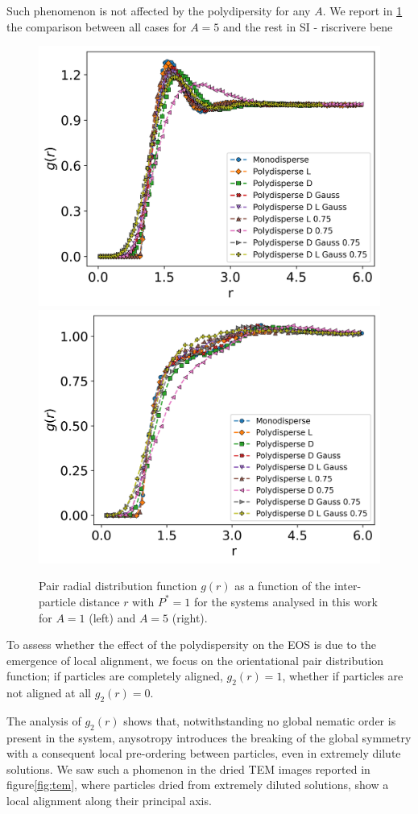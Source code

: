\documentclass[journal=jacsat,manuscript=article]{achemso}
\begin{document}
Such phenomenon is not affected by the polydipersity for any $A$. We report in \ref{fig:G_comparison}  the comparison between all cases for $A=5$ and the rest in SI - riscrivere bene


\begin{figure}[!h]
    \centering
    \includegraphics[width=0.45 \columnwidth]{Figures/G_A1.png}
    \includegraphics[width=0.45 \columnwidth]{Figures/G_A5.png}
    \caption{Pair radial distribution function $g(r)$ as a function of the inter-particle distance $r$ with $P^* = 1$ for the systems analysed in this work for $A = 1$ (left) and $A = 5$ (right).}
    \label{fig:G_comparison}
\end{figure}



To assess whether the effect of the polydispersity on the EOS is due to the emergence of local alignment, we focus on the orientational pair distribution function; if particles are completely aligned, $g_2(r)=1$, whether if particles are not aligned at all $g_2(r)=0$. 

The analysis of $g_2(r)$ shows that, notwithstanding no global nematic order is present in the system, anysotropy introduces the breaking of the global symmetry with a consequent local pre-ordering between particles, even in extremely dilute solutions. We saw such a phomenon in the dried TEM images reported in figure\ref{fig:tem}, where particles dried from extremely diluted solutions, show a local alignment along their principal axis. 
\end{document}
